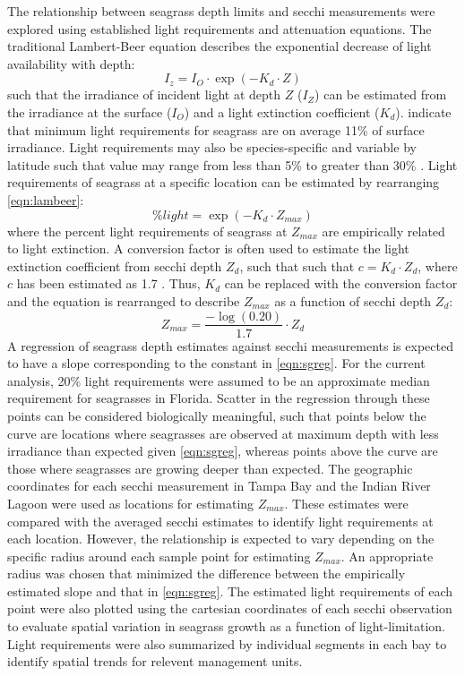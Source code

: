 \documentclass[letterpaper,12pt,oneside]{article}\usepackage[]{graphicx}\usepackage[]{color}
\begin{document}
The relationship between seagrass depth limits and secchi measurements were explored using established light requirements and attenuation equations.  The traditional Lambert-Beer equation describes the exponential decrease of light availability with depth:
\begin{equation} \label{eqn:lambeer}
I_{z} = I_{O} \cdot \exp\left(-K_{d} \cdot Z\right)
\end{equation}
\noindent such that the irradiance of incident light at depth $Z$ ($I_{Z}$) can be estimated from the irradiance at the surface ($I_{O}$) and a light extinction coefficient ($K_{d}$). \citet{Duarte91} indicate that minimum light requirements for seagrass are on average 11\% of surface irradiance.  Light requirements may also be species-specific and variable by latitude such that value may range from less than 5\% to greater than 30\% \citep{Dennison93}.  Light requirements of seagrass at a specific location can be estimated by rearranging \cref{eqn:lambeer}:
\begin{equation} \label{eqn:perclight}
\% light = \exp\left(-K_{d} \cdot Z_{max}\right)
\end{equation}
\noindent where the percent light requirements of seagrass at $Z_{max}$ are empirically related to light extinction. A conversion factor is often used to estimate the light extinction coefficient from secchi depth $Z_{d}$, such that such that $c = K_{d} \cdot Z_{d}$, where $c$ has been estimated as 1.7 \citep{Poole29,Idso74}.  Thus, $K_{d}$ can be replaced with the conversion factor and the equation is rearranged to describe $Z_{max}$ as a function of secchi depth $Z_{d}$:
\begin{equation} \label{eqn:sgreg}
Z_{max} = \frac{-\log\left(0.20\right)}{1.7} \cdot Z_{d}
\end{equation}
\noindent A regression of seagrass depth estimates against secchi measurements is expected to have a slope corresponding to the constant in \cref{eqn:sgreg}.  For the current analysis, 20\% light requirements were assumed to be an approximate median requirement for seagrasses in Florida.  Scatter in the regression through these points can be considered biologically meaningful, such that points below the curve are locations where seagrasses are observed at maximum depth with less irradiance than expected given \cref{eqn:sgreg}, whereas points above the curve are those where seagrasses are growing deeper than expected. The geographic coordinates for each secchi measurement in Tampa Bay and the Indian River Lagoon were used as locations for estimating $Z_{max}$.  These estimates were compared with the averaged secchi estimates to identify light requirements at each location.  However, the relationship is expected to vary depending on the specific radius around each sample point for estimating $Z_{max}$.  An appropriate radius was chosen that minimized the difference between the empirically estimated slope and that in \cref{eqn:sgreg}.   The estimated light requirements of each point were also plotted using the cartesian coordinates of each secchi observation to evaluate spatial variation in seagrass growth as a function of light-limitation.  Light requirements were also summarized by individual segments in each bay to identify spatial trends for relevent management units.  
\end{document}
